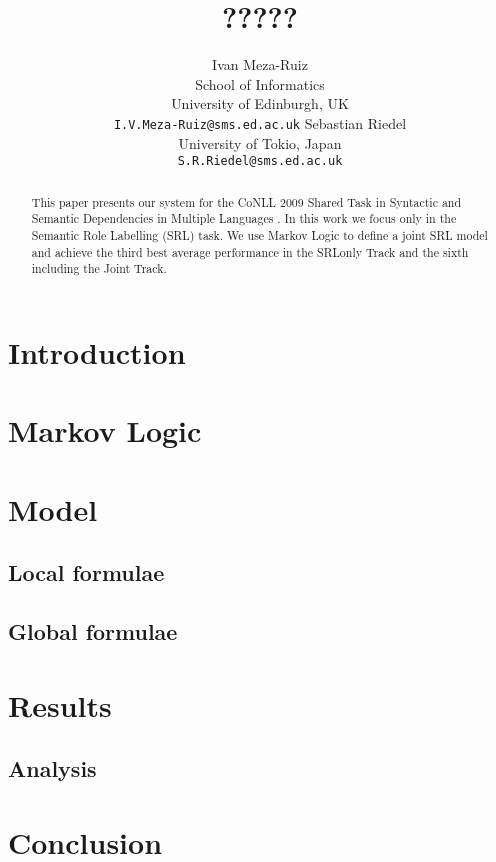 \documentclass[11pt]{article}
\title{?????}
\author{Ivan Meza-Ruiz \\
  School of Informatics\\
  University of Edinburgh, UK\\
  {\tt I.V.Meza-Ruiz@sms.ed.ac.uk} \And
  Sebastian Riedel\\
  University of Tokio, Japan\\
  {\tt S.R.Riedel@sms.ed.ac.uk}
  }
\date{}
\begin{document}
 


\maketitle
\begin{abstract}
This paper presents our system for the CoNLL 2009 Shared
Task in Syntactic and Semantic Dependencies in Multiple
Languages \citep{CoNLL-2009-ST}. In this work we focus only
in the Semantic Role Labelling (SRL) task. We use Markov Logic to define a joint SRL model and achieve
the third best average performance in the SRLonly Track and the sixth including
the Joint Track.
\end{abstract}

\section{Introduction}



\section{Markov Logic} \label{sec:markovlogic}



\section{Model} \label{sec:model} 


\subsection{Local formulae}\label{sec:local} 
 


\subsection{Global formulae}



\section{Results}\label{sec:results}



\subsection{Analysis}\label{sec:analysis}



\section{Conclusion} \label{sec:conclusion}





\end{document}
